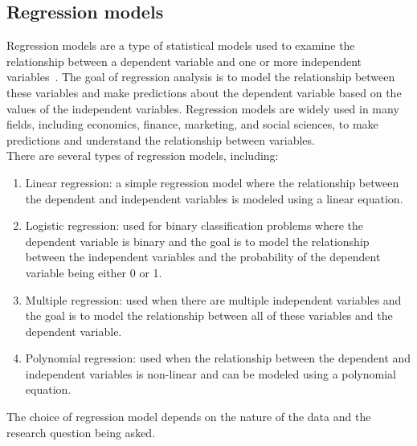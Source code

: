     \subsection{Regression models} \label{sec:longlp}
    Regression models are a type of statistical models used to examine the relationship between a dependent variable and one or more independent variables~\cite{Fahrmeir}.
    The goal of regression analysis is to model the relationship between these variables and make predictions about the dependent variable based on
    the values of the independent variables. Regression models are widely used in many fields, including economics, finance, marketing, and social sciences,
    to make predictions and understand the relationship between variables.
    \\
    There are several types of regression models, including:
    \\
    \begin{enumerate}
        \item Linear regression: a simple regression model where the relationship between the dependent and independent variables is modeled using a linear equation.
        \item Logistic regression: used for binary classification problems where the dependent variable is binary and the goal is to model the relationship between the independent variables and the probability of the dependent variable being either 0 or 1.
        \item Multiple regression: used when there are multiple independent variables and the goal is to model the relationship between all of these variables and the dependent variable.
        \item Polynomial regression: used when the relationship between the dependent and independent variables is non-linear and can be modeled using a polynomial equation.
    \end{enumerate}

    The choice of regression model depends on the nature of the data and the research question being asked.
